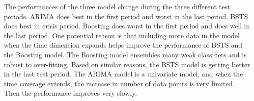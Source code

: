 The performances of the three model change during the three different test periods. ARIMA does best in the first period and worst in the last period. BSTS does best in crisis period. Boosting does worst in the first period and does well in the last period. One potential reason is that including more data in the model when the time dimension expands helps improve the performance of BSTS and the Boosting model. The Boosting model ensembles many weak classifiers and is robust to over-fitting. Based on similar reasons, the BSTS model is getting better in the last test period. The ARIMA model is a univariate model, and when the time coverage extends, the increase in number of data points is very limited. Then the performance improves very slowly.
    






	


